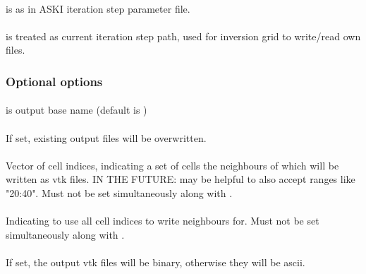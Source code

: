 \paragraph{}
 is  as in ASKI iteration step parameter file.
\paragraph{}
 is treated as current iteration step path, used for inversion grid to write/read own files.
\subsubsection{Optional options}
\paragraph{}
 is output base name (default is )
\paragraph{}
If set, existing output files will be overwritten.
\paragraph{}
Vector of  cell indices, indicating a set of cells the neighbours of which will be written as 
vtk files. IN THE FUTURE: may be helpful to also accept ranges like "20:40".
Must not be set simultaneously along with .
\paragraph{}
Indicating to use all cell indices to write neighbours for. Must not be set simultaneously along with .
\paragraph{}
If set, the output vtk files will be binary, otherwise they will be ascii.
